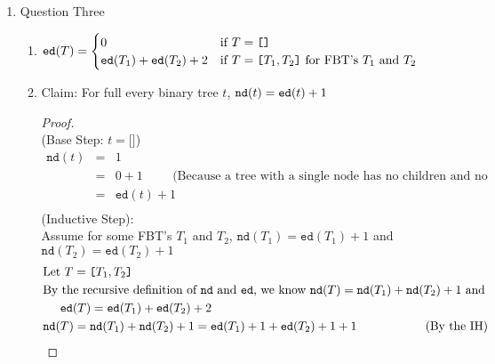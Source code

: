 \documentclass{article}
\begin{document}
\begin{enumerate}
\begin{proof}
\begin{align}
            &\hspace{0.5cm} t_1 \text{ will no longer be connected}
        \end{align}
    \end{proof}
    \item Question Three
    \begin{enumerate}
        \item $\verb|ed|(T) = \begin{cases}
            0 &\text{if } T = \verb|[]| \\
            \verb|ed|(T_1) + \verb|ed|(T_2) + 2 &\text{if } T = \verb|[|T_1, T_2\verb|]| \text{ for FBT's } T_1 \text{ and } T_2
        \end{cases}$
        \item Claim: For full every binary tree $t$, $\verb|nd|(t) = \verb|ed|(t)+1$ \\
        \begin{proof}
            \text{} \\
            (Base Step: $t = \texttt{[]}$)
            \begin{eqnarray}
                \texttt{nd}(t) &=& 1 \\
                &=& 0 + 1 \hspace{1cm} \text{(Because a tree with a single node has no children and no edges)}\\
                &=& \texttt{ed}(t) + 1 \\
            \end{eqnarray}
            (Inductive Step): \\
            Assume for some FBT's $T_1$ and $T_2$, $\texttt{nd}(T_1) = \texttt{ed}(T_1) + 1$ and $\texttt{nd}(T_2) = \texttt{ed}(T_2) + 1$
            \begin{align}
                &\text{Let } T = \texttt{[} T_1, T_2 \texttt{]} \\
                &\text{By the recursive definition of } \texttt{nd} \text{ and } \texttt{ed} \text{, we know } \texttt{nd}(T) = \texttt{nd}(T_1) + \texttt{nd}(T_2) + 1 \text{ and} \\
                &\hspace{0.5cm} \texttt{ed}(T) = \texttt{ed}(T_1) + \texttt{ed}(T_2) + 2 \\
                &\texttt{nd}(T) = \texttt{nd}(T_1) + \texttt{nd}(T_2) + 1 = \texttt{ed}(T_1) + 1 + \texttt{ed}(T_2) + 1 + 1 \hspace{1cm} \hspace{1cm} \text{(By the IH)} \\

\end{align}
\end{proof}
\end{enumerate}
\end{enumerate}
\end{document}
